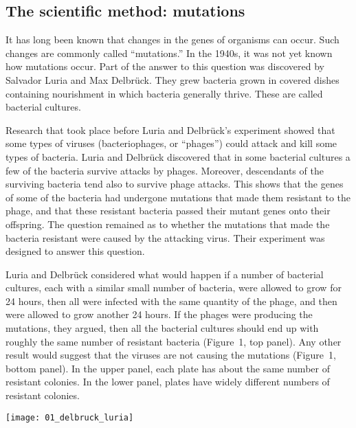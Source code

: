 \documentclass[12pt]{exam}
\begin{document}
\subsection*{The scientific method: mutations}

It has long been known that changes in the genes of organisms can occur.
Such changes are commonly called “mutations.” In the 1940s, it was not
yet known how mutations occur. Part of the answer to this question was
discovered by Salvador Luria and Max
Delbrück. They grew bacteria grown in covered dishes containing nourishment in which bacteria 
generally thrive. These are called bacterial cultures.

Research that took place before Luria and Delbrück's experiment 
showed that some types of viruses (bacteriophages, or “phages”) 
could attack and kill some types of bacteria. Luria and Delbrück discovered that in some bacterial cultures a few of
the bacteria survive attacks by phages. Moreover, descendants of the
surviving bacteria tend also to survive phage attacks. This shows that
the genes of some of the bacteria had undergone mutations that made them
resistant to the phage, and that these resistant bacteria passed their
mutant genes onto their offspring. The question remained as to whether the mutations that made the bacteria
resistant were caused by the attacking virus. Their experiment was designed to
answer this question.

Luria and Delbrück considered what would happen if a number 
of bacterial cultures, each with a similar small number of bacteria,
were allowed to grow for 24 hours, then all were infected with the
same quantity of the phage, and then were allowed to grow another 24 hours. If
the phages were producing the mutations, they argued, then all the
bacterial cultures should end up with roughly the same number of
resistant bacteria (Figure~1, top panel). Any other result would suggest that the viruses are
not causing the mutations (Figure~1, bottom panel). In the upper panel, each plate
has about the same number of resistant colonies. In the lower panel, plates have widely different
numbers of resistant colonies.

\medskip

{\centering\noindent\texttt{[image: 01\_delbruck\_luria]}\par
}

\end{document}
